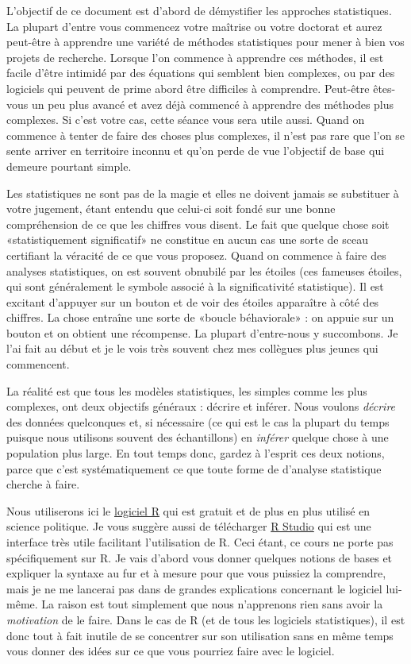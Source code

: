 \documentclass[
]{book}
\begin{document}
L'objectif de ce document est d'abord de démystifier les approches statistiques. La plupart d'entre vous commencez votre maîtrise ou votre doctorat et aurez peut-être à apprendre une variété de méthodes statistiques pour mener à bien vos projets de recherche. Lorsque l'on commence à apprendre ces méthodes, il est facile d'être intimidé par des équations qui semblent bien complexes, ou par des logiciels qui peuvent de prime abord être difficiles à comprendre. Peut-être êtes-vous un peu plus avancé et avez déjà commencé à apprendre des méthodes plus complexes. Si c'est votre cas, cette séance vous sera utile aussi. Quand on commence à tenter de faire des choses plus complexes, il n'est pas rare que l'on se sente arriver en territoire inconnu et qu'on perde de vue l'objectif de base qui demeure pourtant simple.

Les statistiques ne sont pas de la magie et elles ne doivent jamais se substituer à votre jugement, étant entendu que celui-ci soit fondé sur une bonne compréhension de ce que les chiffres vous disent. Le fait que quelque chose soit «statistiquement significatif» ne constitue en aucun cas une sorte de sceau certifiant la véracité de ce que vous proposez. Quand on commence à faire des analyses statistiques, on est souvent obnubilé par les étoiles (ces fameuses étoiles, qui sont généralement le symbole associé à la significativité statistique). Il est excitant d'appuyer sur un bouton et de voir des étoiles apparaître à côté des chiffres. La chose entraîne une sorte de «boucle béhaviorale» : on appuie sur un bouton et on obtient une récompense. La plupart d'entre-nous y succombons. Je l'ai fait au début et je le vois très souvent chez mes collègues plus jeunes qui commencent.

La réalité est que tous les modèles statistiques, les simples comme les plus complexes, ont deux objectifs généraux : décrire et inférer. Nous voulons \emph{décrire} des données quelconques et, si nécessaire (ce qui est le cas la plupart du temps puisque nous utilisons souvent des échantillons) en \emph{inférer} quelque chose à une population plus large. En tout temps donc, gardez à l'esprit ces deux notions, parce que c'est systématiquement ce que toute forme de d'analyse statistique cherche à faire.

Nous utiliserons ici le \href{https://www.r-project.org}{logiciel R} qui est gratuit et de plus en plus utilisé en science politique. Je vous suggère aussi de télécharger \href{https://www.rstudio.com}{R Studio} qui est une interface très utile facilitant l'utilisation de R. Ceci étant, ce cours ne porte pas spécifiquement sur R. Je vais d'abord vous donner quelques notions de bases et expliquer la syntaxe au fur et à mesure pour que vous puissiez la comprendre, mais je ne me lancerai pas dans de grandes explications concernant le logiciel lui-même. La raison est tout simplement que nous n'apprenons rien sans avoir la \emph{motivation} de le faire. Dans le cas de R (et de tous les logiciels statistiques), il est donc tout à fait inutile de se concentrer sur son utilisation sans en même temps vous donner des idées sur ce que vous pourriez faire avec le logiciel.
\end{document}
